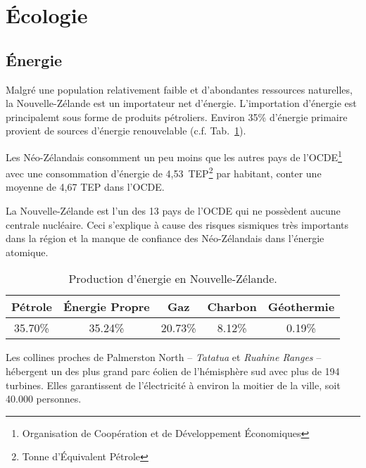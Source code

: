 \documentclass[11pt,journal]{RapportFR}
\newcommand{\Nz}{Nouvelle-Z\'elande\xspace}
\newcommand{\Nzs}{N\'eo-Z\'elandais\xspace}
\begin{document}

\section{\'Ecologie}
\label{sub:eco}

\subsection{\'Energie}
\label{sub:power}

Malgré une population relativement faible et d'abondantes ressources naturelles, la \Nz est un importateur net d'énergie. 
L'importation d'énergie est principalemt sous forme de produits pétroliers. 
Environ 35\% d'énergie primaire provient de sources d'énergie renouvelable (c.f. Tab.~\ref{tab:energy}). 

Les \Nzs consomment un peu moins que les autres pays de l'OCDE\footnote{Organisation {\tiny de} Coopération {\tiny et de} Développement \'Economiques} avec une consommation d'énergie de 4,53~TEP\footnote{Tonne d'\'Equivalent Pétrole} par habitant, conter une moyenne de 4,67 TEP dans l'OCDE. 

La \Nz est l'un des 13 pays de l'OCDE qui ne poss\`edent aucune centrale nucléaire. Ceci s'explique \`a cause des risques sismiques tr\`es importants dans la r\'egion et la manque de confiance des \Nzs dans l'\'energie atomique.

\begin{table}[h]
  \begin{center}
    \begin{footnotesize}
      \begin{tabular}{|c|c|c|c|c|}
        
        \hline
        P\'etrole & \'Energie Propre & Gaz & Charbon & G\'eothermie \\
        \hline
        35.70\% & 35.24\% & 20.73\% & 8.12\% & 0.19\%\\
        \hline
      \end{tabular}
      
    \end{footnotesize}
    \caption{Production d'\'energie en \Nz.}
    \label{tab:energy}
  \end{center}
\end{table}
\vspace{-5mm}

Les collines proches de Palmerston North -- \emph{Tatatua} et \emph{Ruahine Ranges} -- h\'ebergent un des plus grand parc \'eolien de l'h\'emisph\`ere sud avec plus de 194 turbines. Elles garantissent de l'\'electricit\'e \`a environ la moitier de la ville, soit 40.000 personnes.
\end{document}
